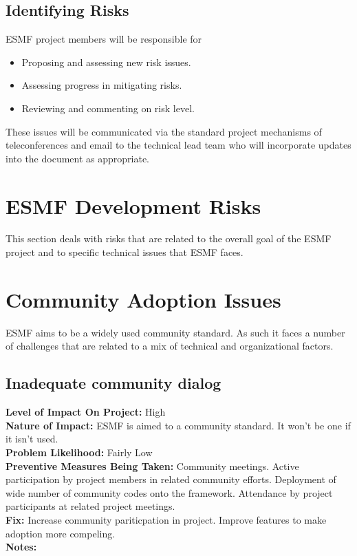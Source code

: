 \documentclass[english]{article}
\newcommand{\req}[1]{\section{\hspace{.2in}#1}}
\newcommand{\sreq}[1]{\subsection{\hspace{.2in}#1}}
\newenvironment
{reqlist}
{\begin{list} {} {} \rm \item[]}
{\end{list}}
\begin{document}
\subsection{Identifying Risks}
ESMF project members will be responsible for
\begin{itemize}
\item Proposing and assessing new risk issues.
\item Assessing progress in mitigating risks.
\item Reviewing and commenting on risk level.
\end{itemize}
These issues will be communicated via the standard 
project mechanisms of teleconferences and email to the technical lead team who will incorporate updates
into the document as appropriate.

\section{ESMF Development Risks}

This section deals with risks that are related to the overall goal of the ESMF project and
to specific technical issues that ESMF faces.

\req{Community Adoption Issues}
ESMF aims to be a widely used community standard. As such it faces a number of challenges that are
related to a mix of technical and organizational factors.
\sreq{Inadequate community dialog}
\begin{reqlist}
{\bf Level of Impact On Project:}  High \\
{\bf Nature of Impact:} ESMF is aimed to a community standard. It won't be one if it isn't used.\\
{\bf Problem Likelihood:} Fairly Low\\
{\bf Preventive Measures Being Taken:} Community meetings. Active participation by project
members in related community efforts. Deployment of wide number of community codes
onto the framework. Attendance by project participants at related project
meetings.\\
{\bf Fix:} Increase community pariticpation in project. Improve features to make
adoption more compeling.\\
{\bf Notes:} \\
\end{reqlist}
\end{document}
